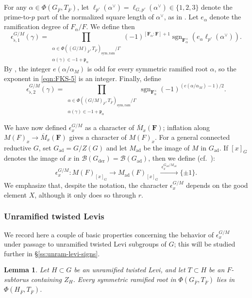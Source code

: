 \documentclass[reqno]{amsart}
\numberwithin{equation}{subsection}
\newcommand{\F}{\mathbf{F}}
\newcommand{\sgn}{\operatorname{sgn}}
\newcommand{\ol}[1]{\overline{#1}}
\newcommand{\co}{\colon}
\newcommand\cB{\mathcal{B}}
\newcommand\frp{\mathfrak{p}}
\DeclareMathOperator{\ad}{ad}
\DeclareMathOperator{\der}{der}
\newtheorem{lemma}[thm]{Lemma}
\theoremstyle{remark}
\numberwithin{equation}{subsection}
\numberwithin{figure}{subsection}
\begin{document}
For any $\alpha \in \Phi(G_{\ol F}, T_{\ol F})$, let $\ell_{p'}(\alpha^\vee) = \ell_{G,p'}(\alpha^\vee) \in \{1,2,3\}$ denote the prime-to-$p$ part of the normalized square length of $\alpha^\vee$, as in \cite[Definition 5.4.1]{FKS23}. Let $e_\alpha$ denote the ramification degree of $F_\alpha/F$. We define then
\begin{equation}\label{eqn:FKS-4}
\epsilon_{\flat,1}^{G/M}(\gamma) = \prod_{\substack{\alpha \in \Phi((G/M)_{\ol F},T_{\ol F})_{\mathrm{sym,ram}}/\Gamma \\ \alpha(\gamma) \in -1 + \frp_\alpha}} (-1)^{[\F_\alpha:\F]+1}\sgn_{\F_\alpha^\times}(e_\alpha \ell_{p'}(\alpha^\vee)).
\end{equation}
By \cite[Lemma 5.6.5]{FKS23}, the integer $e(\alpha/\alpha_M)$ is odd for every symmetric ramified root $\alpha$, so the exponent in \eqref{eqn:FKS-5} is an integer. Finally, define
\begin{equation}\label{eqn:FKS-5}
\epsilon_{\flat,2}^{G/M}(\gamma) = \prod_{\substack{\alpha \in \Phi((G/M)_{\ol F},T_{\ol F})_{\mathrm{sym,ram}}/\Gamma \\ \alpha(\gamma) \in -1 + \frp_\alpha}} \sgn_{\F_\alpha^\times}(-1)^{(e(\alpha/\alpha_M) - 1)/2}.
\end{equation}

We have now defined $\epsilon_x^{G/M}$ as a character of $\ol M_x(\F)$; inflation along $M(F)_x\to\ol M_x(\F)$ gives a character of $M(F)_x$. For a general connected reductive $G$, set $G_{\mathrm{ad}}=G/Z(G)$ and let $M_{\mathrm{ad}}$ be the image of $M$ in $G_{\mathrm{ad}}$. If $[x]_G$ denotes the image of $x$ in $\cB(G_{\der}) = \cB(G_{\ad})$, then we define (cf.\ \cite[Lemma 4.1.2 and Definition 4.1.10]{FKS23}):
\[
\epsilon_x^{G/M}\co M(F)_{[x]_G}\longrightarrow M_{\mathrm{ad}}(F)_{[x]_G}
\xrightarrow{\ \epsilon_x^{G_{\mathrm{ad}}/M_{\mathrm{ad}}}\ }\{\pm1\}.
\]
We emphasize that, despite the notation, the character $\epsilon_x^{G/M}$ depends on the good element $X$, although it only does so through $r$.

\subsubsection{Unramified twisted Levis}

We record here a couple of basic properties concerning the behavior of $\epsilon_x^{G/M}$ under passage to unramified twisted Levi subgroups of $G$; this will be studied further in \S\ref{ss:unram-levi-signs}.

\begin{lemma}\label{lemma:unramified-levi-not-ramified-symmetric}
Let $H \subset G$ be an unramified twisted Levi, and let $T \subset H$ be an $F$-subtorus containing $Z_H$. Every symmetric ramified root in $\Phi(G_{\ol F}, T_{\ol F})$ lies in $\Phi(H_{\ol F}, T_{\ol F})$.
\end{lemma}
\end{document}
